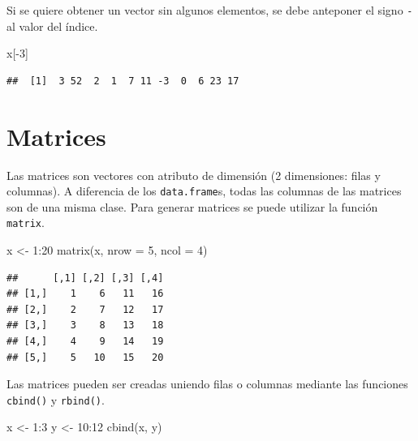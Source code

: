 \documentclass[
]{book}
\newenvironment{Shaded}{\begin{snugshade}}{\end{snugshade}}
\newcommand{\AttributeTok}[1]{\textcolor[rgb]{0.77,0.63,0.00}{#1}}
\newcommand{\DecValTok}[1]{\textcolor[rgb]{0.00,0.00,0.81}{#1}}
\newcommand{\FunctionTok}[1]{\textcolor[rgb]{0.00,0.00,0.00}{#1}}
\newcommand{\NormalTok}[1]{#1}
\newcommand{\OtherTok}[1]{\textcolor[rgb]{0.56,0.35,0.01}{#1}}
\newcommand{\SpecialCharTok}[1]{\textcolor[rgb]{0.00,0.00,0.00}{#1}}
\begin{document}
Si se quiere obtener un vector sin algunos elementos, se debe anteponer el signo \texttt{-} al valor del índice.

\begin{Shaded}
\begin{Highlighting}[]
\NormalTok{x[}\SpecialCharTok{{-}}\DecValTok{3}\NormalTok{]}
\end{Highlighting}
\end{Shaded}

\begin{verbatim}
##  [1]  3 52  2  1  7 11 -3  0  6 23 17
\end{verbatim}

\hypertarget{matrices}{%
\section{Matrices}\label{matrices}}

Las matrices son vectores con atributo de dimensión (2 dimensiones: filas y columnas). A diferencia de los \texttt{data.frame}s, todas las columnas de las matrices son de una misma clase. Para generar matrices se puede utilizar la función \texttt{matrix}.

\begin{Shaded}
\begin{Highlighting}[]
\NormalTok{x }\OtherTok{\textless{}{-}} \DecValTok{1}\SpecialCharTok{:}\DecValTok{20}
\FunctionTok{matrix}\NormalTok{(x, }\AttributeTok{nrow =} \DecValTok{5}\NormalTok{, }\AttributeTok{ncol =} \DecValTok{4}\NormalTok{)}
\end{Highlighting}
\end{Shaded}

\begin{verbatim}
##      [,1] [,2] [,3] [,4]
## [1,]    1    6   11   16
## [2,]    2    7   12   17
## [3,]    3    8   13   18
## [4,]    4    9   14   19
## [5,]    5   10   15   20
\end{verbatim}

Las matrices pueden ser creadas uniendo filas o columnas mediante las funciones \texttt{cbind()} y \texttt{rbind()}.

\begin{Shaded}
\begin{Highlighting}[]
\NormalTok{x }\OtherTok{\textless{}{-}} \DecValTok{1}\SpecialCharTok{:}\DecValTok{3}
\NormalTok{y }\OtherTok{\textless{}{-}} \DecValTok{10}\SpecialCharTok{:}\DecValTok{12}
\FunctionTok{cbind}\NormalTok{(x, y)}
\end{Highlighting}
\end{Shaded}
\end{document}
